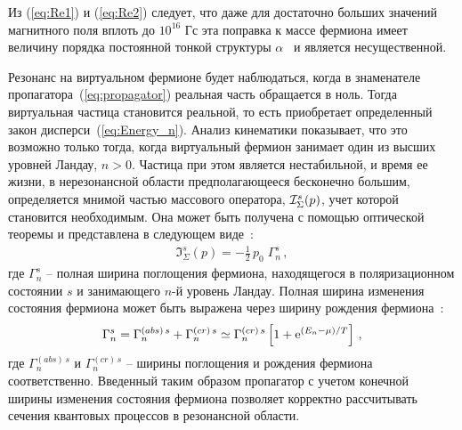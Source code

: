 Из (\ref{eq:Re1}) и (\ref{eq:Re2}) следует, что даже для достаточно больших значений магнитного поля вплоть до $10^{16}$ Гс эта поправка к массе фермиона имеет величину порядка постоянной тонкой структуры $\alpha$~\cite{Kuznetsov:2003,Sokolov:1986} и является несущественной.
 
Резонанс на виртуальном фермионе будет наблюдаться, когда в знаменателе пропагатора~(\ref{eq:propagator}) реальная часть обращается в ноль. Тогда виртуальная частица становится реальной, то есть приобретает определенный закон дисперси~(\ref{eq:Energy_n}). Анализ кинематики показывает, что это возможно только тогда, когда виртуальный фермион занимает один из высших уровней Ландау, $n > 0$. Частица при этом является нестабильной, и время ее жизни, в нерезонансной области предполагающееся бесконечно большим, определяется мнимой частью массового оператора,  ${\cal I}^{s}_\Sigma (p)$, учет которой становится необходимым. Она может быть получена с помощью оптической теоремы и представлена в следующем виде~\cite{Borisov:1997, Zhukovski:1994}:
%
\begin{eqnarray}
\Im^{s}_\Sigma (p) = - \frac{1}{2}\, p_0 \; \Gamma_n^{s} \, ,
\label{eq:I_Sigma}
\end{eqnarray}
\noindent где $\Gamma_n^{s}$ -- полная ширина поглощения фермиона, находящегося в поляризационном состоянии $s$ и занимающего  $n$-й уровень Ландау. Полная ширина изменения состояния фермиона может быть выражена через 
ширину рождения фермиона~\cite{Weldon:1983}:
%
\begin{eqnarray}
\label{Gns}
\Gamma_n^{s} = \Gamma^{(abs)\, s}_n + \Gamma^{(cr) \, s}_n \simeq 
\Gamma^{(cr) \, s}_{n} 
\left [1+ \mathrm{e}^{(E_n - \mu)/T} \right ]\, ,
\end{eqnarray}
где $\Gamma^{(abs)\, s}_n$ и $\Gamma^{(cr) \, s}_n$ -- ширины поглощения и рождения фермиона соответственно. Введенный таким образом пропагатор с учетом конечной ширины изменения состояния фермиона  позволяет корректно рассчитывать сечения квантовых процессов в резонансной области.
